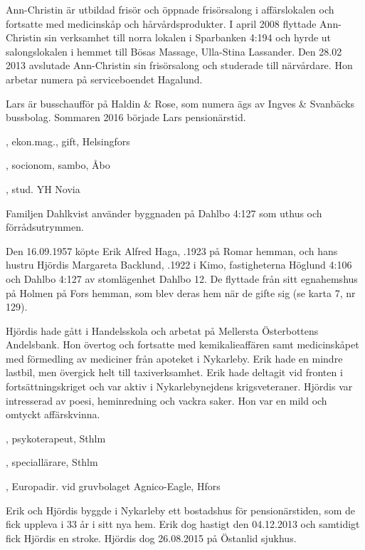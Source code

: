 Ann-Christin är utbildad frisör och öppnade frisörsalong i affärslokalen och fortsatte med medicinskåp och hårvårdsprodukter. I april 2008 flyttade Ann-Christin sin verksamhet till norra lokalen i Sparbanken 4:194 och hyrde ut	salongslokalen i hemmet till Bösas Massage, Ulla-Stina Lassander. Den 28.02 2013 avslutade Ann-Christin sin frisörsalong och studerade till närvårdare. Hon arbetar numera på serviceboendet Hagalund.

Lars är busschaufför på Haldin \& Rose, som numera ägs av Ingves \& Svanbäcks bussbolag. Sommaren 2016 började Lars pensionärstid.
\begin{jhchildren}
  \item {}, ekon.mag., gift, Helsingfors
  \item {}, socionom, sambo, Åbo
  \item {}, stud. YH Novia
\end{jhchildren}
Familjen Dahlkvist använder byggnaden på Dahlbo 4:127 som	uthus och förrådsutrymmen.


Den 16.09.1957 köpte Erik Alfred Haga, .1923 på Romar	hemman, och hans hustru Hjördis Margareta Backlund, .1922 i Kimo, fastigheterna Höglund 4:106 och Dahlbo 4:127 av stomlägenhet Dahlbo 12. De flyttade från sitt egnahemshus på Holmen på	Fors hemman, som blev	deras hem när de gifte sig (se karta 7, nr 129).

Hjördis hade gått i	Handelsskola och arbetat på Mellersta Österbottens Andelsbank. Hon övertog och fortsatte med kemikalieaffären samt medicinskåpet med	förmedling av mediciner från apoteket i Nykarleby. Erik hade en mindre lastbil, men övergick helt till taxiverksamhet. Erik hade deltagit vid	fronten i fortsättningskriget och var aktiv i Nykarlebynejdens krigsveteraner. Hjördis var intresserad av poesi, heminredning och	vackra saker. Hon var en mild och omtyckt affärskvinna.
\begin{jhchildren}
  \item {}, psykoterapeut, Sthlm
  \item {}, speciallärare, Sthlm
  \item {}, Europadir. vid  gruvbolaget Agnico-Eagle, Hfors
\end{jhchildren}
Erik och Hjördis byggde i Nykarleby ett bostadshus för pensionärstiden,	som de fick uppleva i 33 år i sitt nya hem. Erik dog hastigt den 04.12.2013 och samtidigt fick Hjördis en stroke. Hjördis dog 26.08.2015 på Östanlid sjukhus.


